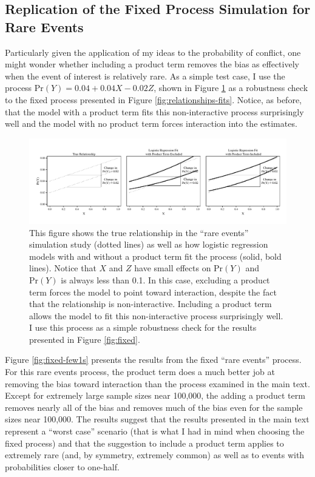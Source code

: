 \documentclass[12pt]{article}
\begin{document}
\begin{appendix}
\section*{Replication of the Fixed Process Simulation for Rare Events}

Particularly given the application of my ideas to the probability of conflict, one might wonder whether including a product term removes the bias as effectively when the event of interest is relatively rare. As a simple test case, I use the process $\text{Pr}(Y) = 0.04 + 0.04X - 0.02Z$, shown in Figure \ref{fig:relationships-fits-few1s} as a robustness check to the fixed process presented in Figure \ref{fig:relationships-fits}. Notice, as before, that the model with a product term fits this non-interactive process surprisingly well and the model with no product term forces interaction into the estimates.

\begin{figure}[H]
\begin{center}
\includegraphics[width=\linewidth]{fig/fig-example-few1s.pdf}
\end{center}
\caption{This figure shows the true relationship in the ``rare events''  simulation study (dotted lines) as well as how logistic regression models with and without a product term fit the process (solid, bold lines). Notice that $X$ and $Z$ have small effects on $\text{Pr}(Y)$ and $\text{Pr}(Y)$ is always less than 0.1. In this case, excluding a product term forces the model to point toward interaction, despite the fact that the relationship is non-interactive. Including a product term allows the model to fit this non-interactive process surprisingly well. I use this process as a simple robustness check for the results presented in Figure \ref{fig:fixed}.}\label{fig:relationships-fits-few1s}
\end{figure}

Figure \ref{fig:fixed-few1s} presents the results from the fixed ``rare events'' process. For this rare events process, the product term does a much better job at removing the bias toward interaction than the process examined in the main text. Except for extremely large sample sizes near 100,000, the adding a product term removes nearly all of the bias and removes much of the bias even for the sample sizes near 100,000. The results suggest that the results presented in the main text represent a ``worst case'' scenario (that is what I had in mind when choosing the fixed process) and that the suggestion to include a product term applies to extremely rare (and, by symmetry, extremely common) as well as to events with probabilities closer to one-half.  


\end{appendix}
\end{document}
